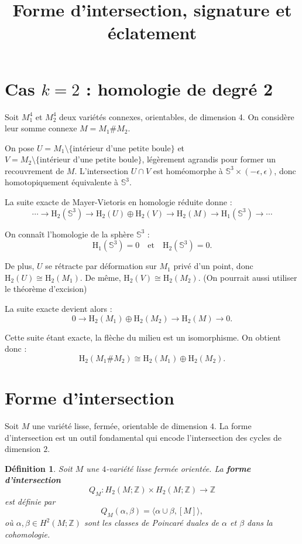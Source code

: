\documentclass{article}
\newcommand{\Hom}{\mathrm{H}}
\newtheorem{definition}{Définition}
\newcommand{\Z}{\mathbb{Z}}
\begin{document}
\title{Forme d'intersection, signature et éclatement}
\author{}
\date{}
\maketitle

\section*{Cas \(k = 2\) : homologie de degr\'e 2}

Soit \(M_1^4\) et \(M_2^4\) deux vari\'et\'es connexes, orientables, de dimension 4. On consid\`ere leur somme connexe \(M = M_1 \# M_2\).

On pose \(U = M_1 \setminus \{\text{int\'erieur d'une petite boule}\}\) et \(V = M_2 \setminus \{\text{int\'erieur d'une petite boule}\}\), l\'eg\`erement agrandis pour former un recouvrement de \(M\). L'intersection \(U \cap V\) est hom\'eomorphe \`a \(\mathbb{S}^3 \times (-\epsilon, \epsilon)\), donc homotopiquement \'equivalente \`a \(\mathbb{S}^3\).

La suite exacte de Mayer-Vietoris en homologie r\'eduite donne :
\[
\cdots \to \Hom_2(\mathbb{S}^3) \to \Hom_2(U) \oplus \Hom_2(V) \to \Hom_2(M) \to \Hom_1(\mathbb{S}^3) \to \cdots
\]

On conna\^it l'homologie de la sph\`ere \(\mathbb{S}^3\) :
\[
\Hom_1(\mathbb{S}^3) = 0 \quad \text{et} \quad \Hom_2(\mathbb{S}^3) = 0.
\]

De plus, \(U\) se r\'etracte par d\'eformation sur \(M_1\) priv\'e d'un point, donc \(\Hom_2(U) \cong \Hom_2(M_1)\). De m\^eme, \(\Hom_2(V) \cong \Hom_2(M_2)\). (On pourrait aussi utiliser le théorème d'excision)

La suite exacte devient alors :
\[
0 \to \Hom_2(M_1) \oplus \Hom_2(M_2) \to \Hom_2(M) \to 0.
\]

Cette suite \'etant exacte, la fl\`eche du milieu est un isomorphisme. On obtient donc :
\[
\boxed{\Hom_2(M_1 \# M_2) \cong \Hom_2(M_1) \oplus \Hom_2(M_2)}.
\]

\section{Forme d'intersection}

Soit $M$ une variété lisse, fermée, orientable de dimension $4$. La forme d'intersection est un outil fondamental qui encode l'intersection des cycles de dimension $2$.

\begin{definition}
Soit $M$ une $4$-variété lisse fermée orientée. La \textbf{forme d'intersection}
\[
Q_M : H_2(M;\Z) \times H_2(M;\Z) \longrightarrow \Z
\]
est définie par
\[
Q_M(\alpha,\beta) = \langle \alpha \cup \beta, [M] \rangle,
\]
où $\alpha,\beta \in H^2(M;\Z)$ sont les classes de Poincaré duales de $\alpha$ et $\beta$ dans la cohomologie. 
\end{definition}
\end{document}

